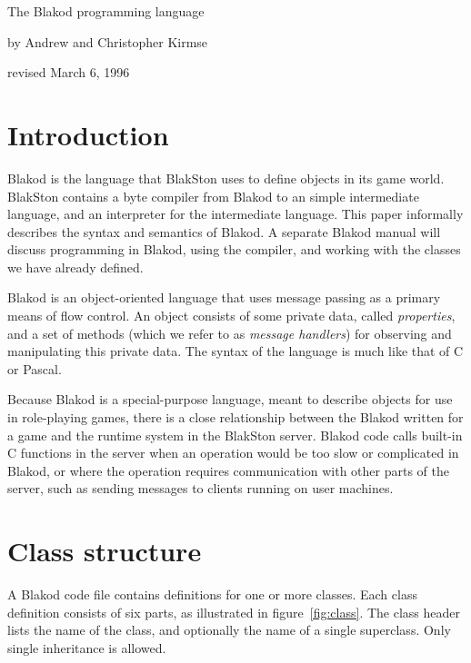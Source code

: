 \documentclass[12pt]{article}
\begin{document}
\begin{center}
{\LARGE The Blakod programming language}
\vspace{0.2in}

{\Large by Andrew and Christopher Kirmse}

\vspace{0.2in}

{\Large revised March 6, 1996}
\end{center}


\section{Introduction}

Blakod is the language that BlakSton uses to define objects in its
game world.  BlakSton contains a byte compiler from Blakod to an
simple intermediate language, and an interpreter for the intermediate
language.  This paper informally describes the syntax and semantics of
Blakod.  A separate Blakod manual will discuss programming in Blakod,
using the compiler, and working with the classes we have already
defined.

Blakod is an object-oriented language that uses message passing as a
primary means of flow control.  An object consists of some private
data, called {\em properties\/}, and a set of methods (which we refer
to as {\em message handlers\/}) for observing and manipulating this
private data.  The syntax of the language is much like that of
C or Pascal.  

Because Blakod is a special-purpose language, meant to describe
objects for use in role-playing games, there is a close relationship
between the Blakod written for a game and the runtime system in the
BlakSton server.  Blakod code calls built-in C functions in the server
when an operation would be too slow or complicated in Blakod, or where
the operation requires communication with other parts of the server,
such as sending messages to clients running on user machines.


\section{Class structure}

A Blakod code file contains definitions for one or more classes.  Each
class definition consists of six parts, as illustrated in
figure~\ref{fig:class}.  The class header lists the name of the class,
and optionally the name of a single superclass.  Only single
inheritance is allowed.
\end{document}

